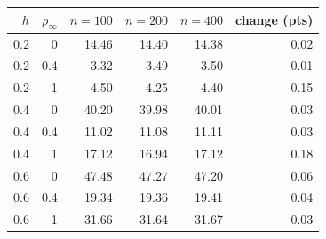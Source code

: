 \begin{tabular}{rrrrrr}\toprule
$h$ & $\rho_\infty$ & $n=100$ & $n=200$ & $n=400$ & change (pts) \\\midrule
0.2 & 0 & 14.46 & 14.40 & 14.38 & 0.02 \\
0.2 & 0.4 & 3.32 & 3.49 & 3.50 & 0.01 \\
0.2 & 1 & 4.50 & 4.25 & 4.40 & 0.15 \\
0.4 & 0 & 40.20 & 39.98 & 40.01 & 0.03 \\
0.4 & 0.4 & 11.02 & 11.08 & 11.11 & 0.03 \\
0.4 & 1 & 17.12 & 16.94 & 17.12 & 0.18 \\
0.6 & 0 & 47.48 & 47.27 & 47.20 & 0.06 \\
0.6 & 0.4 & 19.34 & 19.36 & 19.41 & 0.04 \\
0.6 & 1 & 31.66 & 31.64 & 31.67 & 0.03 \\
\bottomrule\end{tabular}
